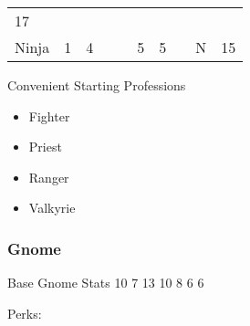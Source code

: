 \documentclass[12pt]{article}
\begin{document}
\begin{longtable}[]{@{}llllllllll@{}}
\begin{minipage}[t]{0.08\columnwidth}
17
\strut\end{minipage}\tabularnewline
\begin{minipage}[t]{0.13\columnwidth}\raggedright\strut
Ninja
\strut\end{minipage} &
\begin{minipage}[t]{0.06\columnwidth}\raggedright\strut
1
\strut\end{minipage} &
\begin{minipage}[t]{0.06\columnwidth}\raggedright\strut
4
\strut\end{minipage} &
\begin{minipage}[t]{0.06\columnwidth}\raggedright\strut
\strut\end{minipage} &
\begin{minipage}[t]{0.06\columnwidth}\raggedright\strut
\strut\end{minipage} &
\begin{minipage}[t]{0.06\columnwidth}\raggedright\strut
5
\strut\end{minipage} &
\begin{minipage}[t]{0.06\columnwidth}\raggedright\strut
5
\strut\end{minipage} &
\begin{minipage}[t]{0.06\columnwidth}\raggedright\strut
\strut\end{minipage} &
\begin{minipage}[t]{0.07\columnwidth}\raggedright\strut
N
\strut\end{minipage} &
\begin{minipage}[t]{0.08\columnwidth}\raggedright\strut
15
\strut\end{minipage}\tabularnewline
\bottomrule
\end{longtable}

Convenient Starting Professions

\begin{itemize}
\item
  Fighter
\item
  Priest
\item
  Ranger
\item
  Valkyrie
\end{itemize}

\subsubsection{Gnome}\label{gnome}

Base Gnome Stats 10 7 13 10 8 6 6

Perks:
\end{document}
